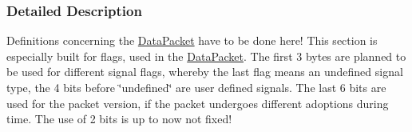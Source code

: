 \subsubsection{Detailed Description}
Definitions concerning the \hyperlink{class_data_packet}{DataPacket} have to be done here! This section is especially built for flags, used in the \hyperlink{class_data_packet}{DataPacket}. The first 3 bytes are planned to be used for different signal flags, whereby the last flag means an undefined signal type, the 4 bits before \char`\"{}undefined\char`\"{} are user defined signals. The last 6 bits are used for the packet version, if the packet undergoes different adoptions during time. The use of 2 bits is up to now not fixed! 